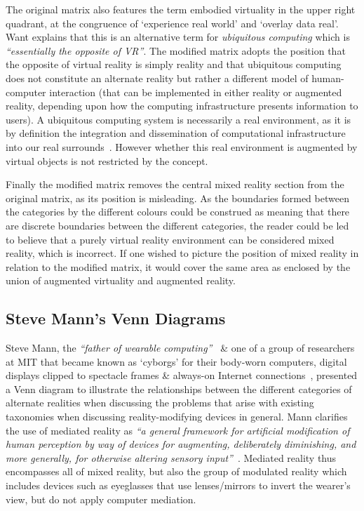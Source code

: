 The original matrix also features the term embodied virtuality in the upper right quadrant, at the congruence of `experience real world' and `overlay data real'. Want explains that this is an alternative term for \textit{ubiquitous computing} which is \textit{``essentially the opposite of VR''}. The modified matrix adopts the position that the opposite of virtual reality is simply reality and that ubiquitous computing does not constitute an alternate reality but rather a different model of human-computer interaction (that can be implemented in either reality or augmented reality, depending upon how the computing infrastructure presents information to users). A ubiquitous computing system is necessarily a real environment, as it is by definition the integration and dissemination of computational infrastructure into our real surrounds~\cite{York2004}. However whether this real environment is augmented by virtual objects is not restricted by the concept.

Finally the modified matrix removes the central mixed reality section from the original matrix, as its position is misleading. As the boundaries formed between the categories by the different colours could be construed as meaning that there are discrete boundaries between the different categories, the reader could be led to believe that a purely virtual reality environment can be considered mixed reality, which is incorrect. If one wished to picture the position of mixed reality in relation to the modified matrix, it would cover the same area as enclosed by the union of augmented virtuality and augmented reality.


\subsection{Steve Mann's Venn Diagrams}
\label{stevemannvenn}
Steve Mann, the \textit{``father of wearable computing''}~\cite{Schofield2012} \& one of a group of researchers at MIT that became known as `cyborgs' for their body-worn computers, digital displays clipped to spectacle frames \& always-on Internet connections~\cite{Turkle2011}, presented a Venn diagram to illustrate the relationships between the different categories of alternate realities when discussing the problems that arise with existing taxonomies when discussing reality-modifying devices in general. Mann clarifies the use of mediated reality as \textit{``a general framework for artificial modification of human perception by way of devices for augmenting, deliberately diminishing, and more generally, for otherwise altering sensory input''}~\cite{Mann2002a}. Mediated reality thus encompasses all of mixed reality, but also the group of modulated reality which includes devices such as eyeglasses that use lenses/mirrors to invert the wearer's view, but do not apply computer mediation.

